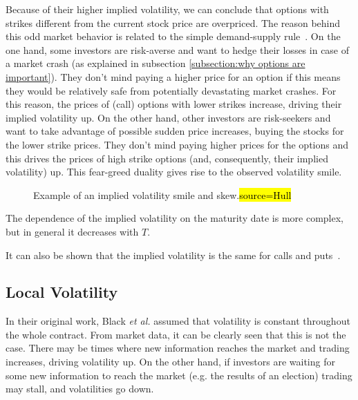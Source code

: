 Because of their higher implied volatility, we can conclude that options with strikes different from the current stock price are overpriced.
The reason behind this odd market behavior is related to the simple demand-supply rule~\cite{Wilmott3}. On the one hand, some investors are risk-averse and want to hedge their losses in case of a market crash (as explained in subsection \ref{subsection:why options are important}). They don't mind paying a higher price for an option if this means they would be relatively safe from potentially devastating market crashes. For this reason, the prices of (call) options with lower strikes increase, driving their implied volatility up. On the other hand, other investors are risk-seekers and want to take advantage of possible sudden price increases, buying the stocks for the lower strike prices. They don't mind paying higher prices for the options and this drives the prices of high strike options (and, consequently, their implied volatility) up. This fear-greed duality gives rise to the observed volatility smile.
   
    
\begin{figure}[!htb]
  \begin{subfigmatrix}{2}
  \end{subfigmatrix}
  \caption[Example of an implied volatility smile (left) and skew (right).]{Example of an implied volatility smile and skew.\hl{source=Hull}}
  \label{fig:smileskew}
\end{figure}

The dependence of the implied volatility on the maturity date is more complex, but in general it decreases with $T$.

It can also be shown that the implied volatility is the same for calls and puts~\cite{Hull}.

\subsection{Local Volatility}
\label{subsection:localvolatility}
In their original work, Black \textit{et al.} assumed that volatility is constant throughout the whole contract. From market data, it can be clearly seen that this is not the case. There may be times where new information reaches the market and trading increases, driving volatility up. On the other hand, if investors are waiting for some new information to reach the market (e.g. the results of an election) trading may stall, and volatilities go down. 

